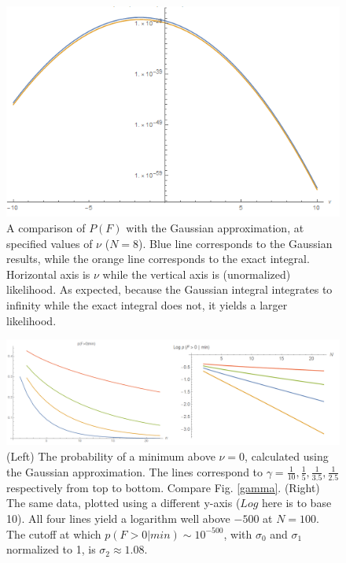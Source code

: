 \documentclass[12pt]{article}
\begin{document}
\begin{figure} 
  \centering
  \includegraphics[width=\linewidth]{Comparison.png}
  \caption{A comparison of $P(F)$ with the Gaussian approximation, at specified values of $\nu$ ($N=8$). Blue line corresponds to the Gaussian results, while the orange line corresponds to the exact integral. Horizontal axis is $\nu$ while the vertical axis is (unormalized) likelihood. As expected, because the Gaussian integral integrates to infinity while the exact integral does not, it yields a larger likelihood.}
  \label{Comparison}
\end{figure}

\begin{figure} 
  \centering
  \includegraphics[width=\linewidth]{PVaryingWithNGaussian.png}
  \caption{(Left) The probability of a minimum above $\nu=0$, calculated using the Gaussian approximation. The lines correspond to $\gamma = \frac{1}{10}, \frac{1}{5}, \frac{1}{3.5}, \frac{1}{2.5}$ respectively from top to bottom. Compare Fig. \ref{gamma}. (Right) The same data, plotted using a different y-axis ($Log$ here is to base 10). All four lines yield a logarithm well above $-500$ at $N=100$. The cutoff at which $p(F>0|min) \sim 10^{-500}$, with $\sigma_0$ and $\sigma_1$ normalized to 1,  is $\sigma_2 \approx 1.08$.}
  \label{PVaryingWithNGaussian}
\end{figure}
\end{document}
